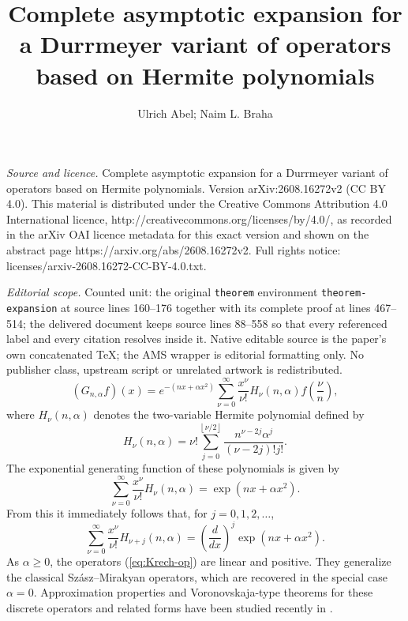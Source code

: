 \documentclass[10pt,a4paper]{amsart}
\begin{document}
\title[Complete asymptotic expansion for a Durrmeyer variant of ope]{Complete asymptotic expansion for a Durrmeyer variant of operators based on Hermite polynomials}
\author{Ulrich Abel; Naim L. Braha}
\date{}
\maketitle
\noindent\emph{Source and licence.} Complete asymptotic expansion for a Durrmeyer variant of operators based on Hermite polynomials. Version arXiv:2608.16272v2 (CC BY 4.0). This material is distributed under the Creative Commons Attribution 4.0 International licence, http://creativecommons.org/licenses/by/4.0/, as recorded in the arXiv OAI licence metadata for this exact version and shown on the abstract page https://arxiv.org/abs/2608.16272v2. Full rights notice: licenses/arxiv-2608.16272-CC-BY-4.0.txt.\par\smallskip
\noindent\textit{Editorial scope.} Counted unit: the original \texttt{theorem} environment \texttt{theorem-expansion} at source lines 160--176 together with its complete proof at lines 467--514; the delivered document keeps source lines 88--558 so that every referenced label and every citation resolves inside it. Native editable source is the paper's own concatenated TeX; the AMS wrapper is editorial formatting only. No publisher class, upstream script or unrelated artwork is redistributed.
\begin{equation}
\left( G_{n,\alpha }f\right) \left( x\right) =e^{-\left( nx+\alpha
x^{2}\right) }\sum_{\nu =0}^{\infty }\frac{x^{\nu }}{\nu !}H_{\nu }\left(
n,\alpha \right) f\left( \frac{\nu }{n}\right) ,  \label{eq:Krech-op}
\end{equation}%
where $H_{\nu }(n,\alpha )$ denotes the two-variable Hermite polynomial
defined by 
\begin{equation*}
H_{\nu }\left( n,\alpha \right) =\nu !\sum_{j=0}^{\left\lfloor \nu
/2\right\rfloor }\frac{n^{\nu -2j}\alpha ^{j}}{\left( \nu -2j\right) !j!}.
\end{equation*}%
The exponential generating function of these polynomials is given by 
\begin{equation*}
\sum_{\nu =0}^{\infty }\frac{x^{\nu }}{\nu !}H_{\nu }\left( n,\alpha \right)
=\exp \left( nx+\alpha x^{2}\right) .
\end{equation*}%
From this it immediately follows that, for $j=0,1,2,\ldots $, 
\begin{equation}
\sum_{\nu =0}^{\infty }\frac{x^{\nu }}{\nu !}H_{\nu +j}\left( n,\alpha
\right) =\left( \frac{d}{dx}\right) ^{j}\exp \left( nx+\alpha x^{2}\right) .
\label{GF}
\end{equation}%
As $\alpha \geq 0$, the operators (\ref{eq:Krech-op}) are linear and
positive. They generalize the classical Sz\'{a}sz--Mirakyan operators, which
are recovered in the special case $\alpha =0$. Approximation properties and
Voronovskaja-type theorems for these discrete operators and related forms
have been studied recently in \cite{AbelBraha2025, Gupta2026}.
\end{document}
